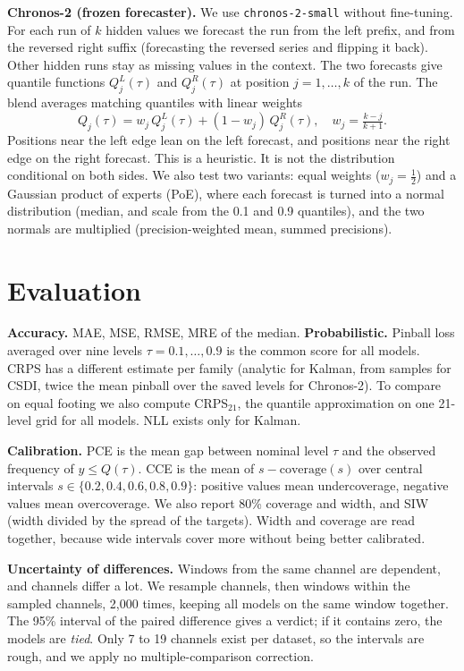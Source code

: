 \documentclass[10pt,twocolumn]{article}
\newcommand{\Chr}{Chronos-2}
\begin{document}
\textbf{\Chr{} (frozen forecaster).} We use \texttt{chronos-2-small} without fine-tuning. For each run of $k$ hidden values we forecast the run from the left prefix, and from the reversed right suffix (forecasting the reversed series and flipping it back). Other hidden runs stay as missing values in the context. The two forecasts give quantile functions $Q^{L}_j(\tau)$ and $Q^{R}_j(\tau)$ at position $j=1,\dots,k$ of the run. The blend averages matching quantiles with linear weights
\begin{equation}
Q_j(\tau)=w_j\,Q^{L}_j(\tau)+(1-w_j)\,Q^{R}_j(\tau),\quad w_j=\tfrac{k-j}{k+1}.
\end{equation}
Positions near the left edge lean on the left forecast, and positions near the right edge on the right forecast. This is a heuristic. It is not the distribution conditional on both sides. We also test two variants: equal weights ($w_j=\tfrac12$) and a Gaussian product of experts (PoE), where each forecast is turned into a normal distribution (median, and scale from the 0.1 and 0.9 quantiles), and the two normals are multiplied (precision-weighted mean, summed precisions).

\section{Evaluation}\label{sec:eval}
\textbf{Accuracy.} MAE, MSE, RMSE, MRE of the median. \textbf{Probabilistic.} Pinball loss averaged over nine levels $\tau=0.1,\dots,0.9$ is the common score for all models. CRPS has a different estimate per family (analytic for Kalman, from samples for CSDI, twice the mean pinball over the saved levels for \Chr{}). To compare on equal footing we also compute CRPS$_{21}$, the quantile approximation on one 21-level grid for all models. NLL exists only for Kalman.

\textbf{Calibration.} PCE is the mean gap between nominal level $\tau$ and the observed frequency of $y\le Q(\tau)$. CCE is the mean of $s-\mathrm{coverage}(s)$ over central intervals $s\in\{0.2,0.4,0.6,0.8,0.9\}$: positive values mean undercoverage, negative values mean overcoverage. We also report 80\% coverage and width, and SIW (width divided by the spread of the targets). Width and coverage are read together, because wide intervals cover more without being better calibrated.

\textbf{Uncertainty of differences.} Windows from the same channel are dependent, and channels differ a lot. We resample channels, then windows within the sampled channels, 2,000 times, keeping all models on the same window together. The 95\% interval of the paired difference gives a verdict; if it contains zero, the models are \emph{tied}. Only 7 to 19 channels exist per dataset, so the intervals are rough, and we apply no multiple-comparison correction.
\end{document}
